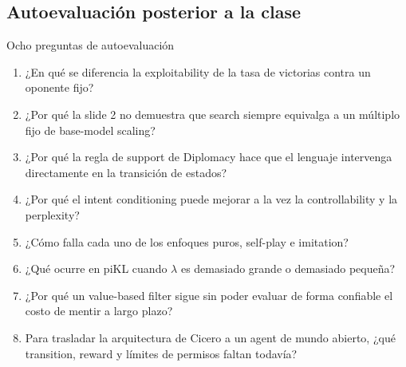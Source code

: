 \documentclass[a4paper]{article}
\begin{document}
\subsection{Autoevaluación posterior a la clase}

\begin{importantbox}{Ocho preguntas de autoevaluación}
\begin{enumerate}
  \item ¿En qué se diferencia la exploitability de la tasa de victorias contra un oponente fijo?
  \item ¿Por qué la slide 2 no demuestra que search siempre equivalga a un múltiplo fijo de base-model scaling?
  \item ¿Por qué la regla de support de Diplomacy hace que el lenguaje intervenga directamente en la transición de estados?
  \item ¿Por qué el intent conditioning puede mejorar a la vez la controllability y la perplexity?
  \item ¿Cómo falla cada uno de los enfoques puros, self-play e imitation?
  \item ¿Qué ocurre en piKL cuando $\lambda$ es demasiado grande o demasiado pequeña?
  \item ¿Por qué un value-based filter sigue sin poder evaluar de forma confiable el costo de mentir a largo plazo?
  \item Para trasladar la arquitectura de Cicero a un agent de mundo abierto, ¿qué transition, reward y límites de permisos faltan todavía?
\end{enumerate}
\end{importantbox}
\end{document}
